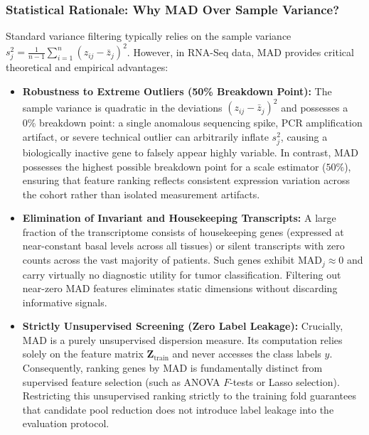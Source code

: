 \documentclass[11pt,a4paper]{article}
\begin{document}
\subsubsection{Statistical Rationale: Why MAD Over Sample Variance?}
Standard variance filtering typically relies on the sample variance $s_j^2 = \frac{1}{n-1}\sum_{i=1}^n (z_{ij} - \bar{z}_j)^2$. However, in RNA-Seq data, MAD provides critical theoretical and empirical advantages:
\begin{itemize}\itemsep=2pt
    \item \textbf{Robustness to Extreme Outliers (50\% Breakdown Point):} The sample variance is quadratic in the deviations $(z_{ij} - \bar{z}_j)^2$ and possesses a 0\% breakdown point: a single anomalous sequencing spike, PCR amplification artifact, or severe technical outlier can arbitrarily inflate $s_j^2$, causing a biologically inactive gene to falsely appear highly variable. In contrast, MAD possesses the highest possible breakdown point for a scale estimator ($50\%$), ensuring that feature ranking reflects consistent expression variation across the cohort rather than isolated measurement artifacts.
    \item \textbf{Elimination of Invariant and Housekeeping Transcripts:} A large fraction of the transcriptome consists of housekeeping genes (expressed at near-constant basal levels across all tissues) or silent transcripts with zero counts across the vast majority of patients. Such genes exhibit $\text{MAD}_j \approx 0$ and carry virtually no diagnostic utility for tumor classification. Filtering out near-zero MAD features eliminates static dimensions without discarding informative signals.
    \item \textbf{Strictly Unsupervised Screening (Zero Label Leakage):} Crucially, MAD is a purely unsupervised dispersion measure. Its computation relies solely on the feature matrix $\mathbf{Z}_{\text{train}}$ and never accesses the class labels $y$. Consequently, ranking genes by MAD is fundamentally distinct from supervised feature selection (such as ANOVA $F$-tests or Lasso selection). Restricting this unsupervised ranking strictly to the training fold guarantees that candidate pool reduction does not introduce label leakage into the evaluation protocol.
\end{itemize}
\end{document}
